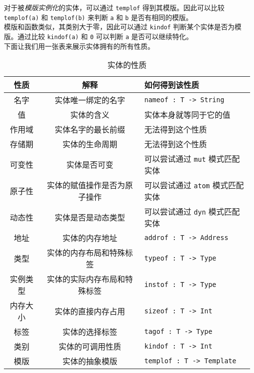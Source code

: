对于被\emph{模版实例化}的实体，可以通过 \lstinline!templof! 得到其模版。因此可以比较 \lstinline!templof(a)! 和 \lstinline!templof(b)! 来判断 \lstinline!a! 和 \lstinline!b! 是否有相同的模版。 \\

模版和函数类似，其类别大于零，因此可以通过 \lstinline!kindof! 判断某个实体是否为模版。通过比较 \lstinline!kindof(a)! 和 \lstinline!0! 可以判断 \lstinline!a! 是否可以继续特化。 \\

下面让我们用一张表来展示实体拥有的所有性质。

\begin{table}[h]
    \centering
    \begin{tabular}{|c|c|l|} \hline
        性质 & 解释 & 如何得到该性质 \\\hline\hline
        名字 & 实体唯一绑定的名字 & \lstinline!nameof : T -> String! \\\hline
        值 & 实体的含义 & 实体本身就等同于它的值 \\\hline
        作用域 & 实体名字的最长前缀 & 无法得到这个性质 \footnotemark[1] \\\hline
        存储期 & 实体的生命周期 & 无法得到这个性质 \footnotemark[1] \\\hline
        可变性 & 实体是否可变 & 可以尝试通过 \lstinline!mut! 模式匹配实体 \footnotemark[2] \\\hline
        原子性 & 实体的赋值操作是否为原子操作 & 可以尝试通过 \lstinline!atom! 模式匹配实体 \footnotemark[2] \\\hline
        动态性 & 实体是否是动态类型 & 可以尝试通过 \lstinline!dyn! 模式匹配实体 \footnotemark[2] \\\hline
        地址 & 实体的内存地址 & \lstinline!addrof : T -> Address! \\\hline
        类型 & 实体的内存布局和特殊标签 & \lstinline!typeof : T -> Type! \\\hline
        实例类型 & 实体的实际内存布局和特殊标签 & \lstinline!instof : T -> Type! \\\hline
        内存大小 & 实体的直接内存占用 & \lstinline!sizeof : T -> Int! \\\hline
        标签 & 实体的选择标签 & \lstinline!tagof : T -> Type! \\\hline
        类别 & 实体的可调用性质 & \lstinline!kindof : T -> Int! \\\hline
        模版 & 实体的抽象模版 & \lstinline!templof : T -> Template! \\\hline
    \end{tabular}
    \caption{实体的性质}
    \label{tab:entity-properties}
\end{table}

